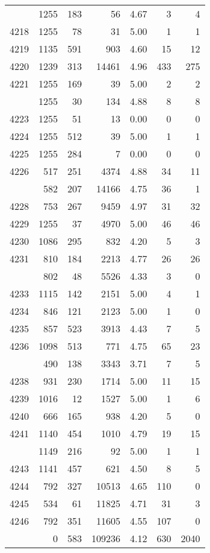 \documentclass[
]{article}
\begin{document}
\begin{table}
\begin{tabular}[t]{lrrrrrr}
\addlinespace
4217 & 1255 & 183 & 56 & 4.67 & 3 & 4\\
4218 & 1255 & 78 & 31 & 5.00 & 1 & 1\\
4219 & 1135 & 591 & 903 & 4.60 & 15 & 12\\
4220 & 1239 & 313 & 14461 & 4.96 & 433 & 275\\
4221 & 1255 & 169 & 39 & 5.00 & 2 & 2\\
\addlinespace
4222 & 1255 & 30 & 134 & 4.88 & 8 & 8\\
4223 & 1255 & 51 & 13 & 0.00 & 0 & 0\\
4224 & 1255 & 512 & 39 & 5.00 & 1 & 1\\
4225 & 1255 & 284 & 7 & 0.00 & 0 & 0\\
4226 & 517 & 251 & 4374 & 4.88 & 34 & 11\\
\addlinespace
4227 & 582 & 207 & 14166 & 4.75 & 36 & 1\\
4228 & 753 & 267 & 9459 & 4.97 & 31 & 32\\
4229 & 1255 & 37 & 4970 & 5.00 & 46 & 46\\
4230 & 1086 & 295 & 832 & 4.20 & 5 & 3\\
4231 & 810 & 184 & 2213 & 4.77 & 26 & 26\\
\addlinespace
4232 & 802 & 48 & 5526 & 4.33 & 3 & 0\\
4233 & 1115 & 142 & 2151 & 5.00 & 4 & 1\\
4234 & 846 & 121 & 2123 & 5.00 & 1 & 0\\
4235 & 857 & 523 & 3913 & 4.43 & 7 & 5\\
4236 & 1098 & 513 & 771 & 4.75 & 65 & 23\\
\addlinespace
4237 & 490 & 138 & 3343 & 3.71 & 7 & 5\\
4238 & 931 & 230 & 1714 & 5.00 & 11 & 15\\
4239 & 1016 & 12 & 1527 & 5.00 & 1 & 6\\
4240 & 666 & 165 & 938 & 4.20 & 5 & 0\\
4241 & 1140 & 454 & 1010 & 4.79 & 19 & 15\\
\addlinespace
4242 & 1149 & 216 & 92 & 5.00 & 1 & 1\\
4243 & 1141 & 457 & 621 & 4.50 & 8 & 5\\
4244 & 792 & 327 & 10513 & 4.65 & 110 & 0\\
4245 & 534 & 61 & 11825 & 4.71 & 31 & 3\\
4246 & 792 & 351 & 11605 & 4.55 & 107 & 0\\
\addlinespace
4247 & 0 & 583 & 109236 & 4.12 & 630 & 2040\\

\end{tabular}
\end{table}
\end{document}
